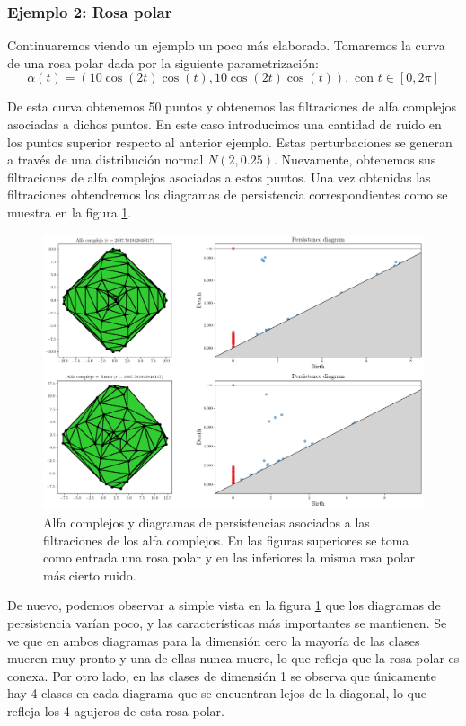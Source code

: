 \subsubsection{Ejemplo 2: Rosa polar}
Continuaremos viendo un ejemplo un poco más elaborado. Tomaremos la curva de una rosa polar dada por la siguiente parametrización:
\[
\alpha(t)= (10\cos(2t)\cos(t), 10\cos(2t)\cos(t)), \text{ con } t\in [0,2\pi]
\]

De esta curva obtenemos 50 puntos y obtenemos las filtraciones de alfa complejos asociadas a dichos puntos. En este caso introducimos una cantidad de ruido en los puntos superior respecto al anterior ejemplo. Estas perturbaciones se generan a través de una distribución normal $N(2, 0.25)$. Nuevamente, obtenemos sus filtraciones de alfa complejos asociadas a estos puntos. Una vez obtenidas las filtraciones obtendremos los diagramas de persistencia correspondientes como se muestra en la figura \ref{ref:persEj2}.

\begin{figure}[!ht]
\centering
\includegraphics[width=\textwidth]{../code/output/ejemplo2.png} 
\caption{Alfa complejos y diagramas de persistencias asociados a las filtraciones de los alfa complejos. En las figuras superiores se toma como entrada una rosa polar y en las inferiores la misma rosa polar más cierto ruido.}
\label{ref:persEj2}
\end{figure} 

De nuevo, podemos observar a simple vista en la figura \ref{ref:persEj2} que los diagramas de persistencia varían poco, y las características más importantes se mantienen. Se ve que en ambos diagramas para la dimensión cero la mayoría de las clases mueren muy pronto y una de ellas nunca muere, lo que refleja que la rosa polar es conexa. Por otro lado, en las clases de dimensión 1 se observa que únicamente hay 4 clases en cada diagrama que se encuentran lejos de la diagonal, lo que refleja los 4 agujeros de esta rosa polar.


